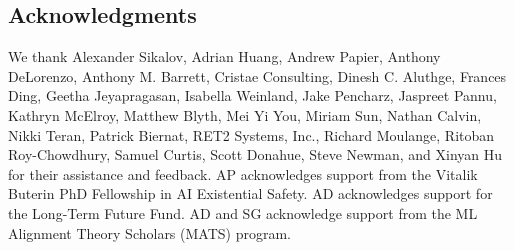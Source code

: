 \subsection*{Acknowledgments}\label{sec:acknowledgments}
We thank Alexander Sikalov, Adrian Huang, Andrew Papier, Anthony DeLorenzo, Anthony M. Barrett, Cristae Consulting, Dinesh C. Aluthge, Frances Ding, Geetha Jeyapragasan, Isabella Weinland, Jake Pencharz, Jaspreet Pannu, Kathryn McElroy, Matthew Blyth, Mei Yi You, Miriam Sun, Nathan Calvin, Nikki Teran, Patrick Biernat, RET2 Systems, Inc., Richard Moulange, Ritoban Roy-Chowdhury, Samuel Curtis, Scott Donahue, Steve Newman, and Xinyan Hu for their assistance and feedback. AP acknowledges support from the Vitalik Buterin PhD Fellowship in AI Existential Safety. AD acknowledges support for the Long-Term Future Fund. AD and SG acknowledge support from the ML Alignment Theory Scholars (MATS) program.

